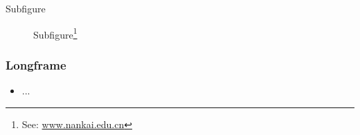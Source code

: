 \begin{frame}{Subfigure}
    \begin{figure}
        \centering
        \caption{Subfigure\footnote{See: \url{www.nankai.edu.cn}}}\label{fig:rnn}
    \end{figure}
\end{frame}

\begin{frame}[allowframebreaks]
    \frametitle{Longframe}
    \begin{itemize}
        \item ...
    \end{itemize}
\end{frame}